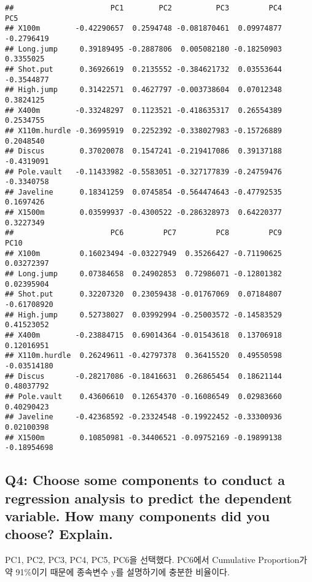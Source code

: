 \documentclass[
]{article}
\begin{document}
\begin{verbatim}
##                      PC1        PC2          PC3         PC4        PC5
## X100m        -0.42290657  0.2594748 -0.081870461  0.09974877 -0.2796419
## Long.jump     0.39189495 -0.2887806  0.005082180 -0.18250903  0.3355025
## Shot.put      0.36926619  0.2135552 -0.384621732  0.03553644 -0.3544877
## High.jump     0.31422571  0.4627797 -0.003738604  0.07012348  0.3824125
## X400m        -0.33248297  0.1123521 -0.418635317  0.26554389  0.2534755
## X110m.hurdle -0.36995919  0.2252392 -0.338027983 -0.15726889  0.2048540
## Discus        0.37020078  0.1547241 -0.219417086  0.39137188 -0.4319091
## Pole.vault   -0.11433982 -0.5583051 -0.327177839 -0.24759476 -0.3340758
## Javeline      0.18341259  0.0745854 -0.564474643 -0.47792535  0.1697426
## X1500m        0.03599937 -0.4300522 -0.286328973  0.64220377  0.3227349
##                      PC6         PC7         PC8         PC9        PC10
## X100m         0.16023494 -0.03227949  0.35266427 -0.71190625  0.03272397
## Long.jump     0.07384658  0.24902853  0.72986071 -0.12801382  0.02395904
## Shot.put      0.32207320  0.23059438 -0.01767069  0.07184807 -0.61708920
## High.jump     0.52738027  0.03992994 -0.25003572 -0.14583529  0.41523052
## X400m        -0.23884715  0.69014364 -0.01543618  0.13706918  0.12016951
## X110m.hurdle  0.26249611 -0.42797378  0.36415520  0.49550598 -0.03514180
## Discus       -0.28217086 -0.18416631  0.26865454  0.18621144  0.48037792
## Pole.vault    0.43606610  0.12654370 -0.16086549  0.02983660  0.40290423
## Javeline     -0.42368592 -0.23324548 -0.19922452 -0.33300936  0.02100398
## X1500m        0.10850981 -0.34406521 -0.09752169 -0.19899138 -0.18954698
\end{verbatim}

\hypertarget{q4-choose-some-components-to-conduct-a-regression-analysis-to-predict-the-dependent-variable.-how-many-components-did-you-choose-explain.}{%
\subsection{Q4: Choose some components to conduct a regression analysis
to predict the dependent variable. How many components did you choose?
Explain.}\label{q4-choose-some-components-to-conduct-a-regression-analysis-to-predict-the-dependent-variable.-how-many-components-did-you-choose-explain.}}

PC1, PC2, PC3, PC4, PC5, PC6을 선택했다. PC6에서 Cumulative Proportion가
약 91\%이기 때문에 종속변수 y를 설명하기에 충분한 비율이다.
\end{document}
